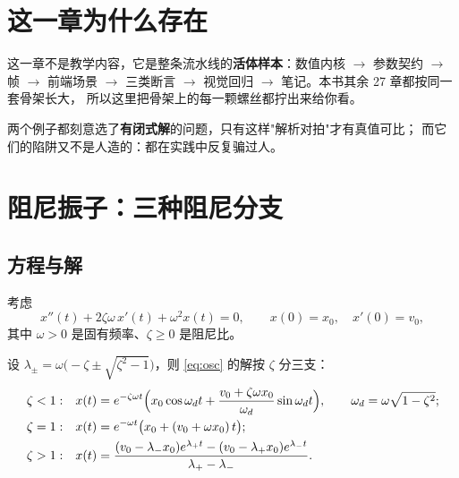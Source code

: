 

\section{这一章为什么存在}

这一章不是教学内容，它是整条流水线的\textbf{活体样本}：数值内核 $\to$ 参数契约 $\to$ 帧
$\to$ 前端场景 $\to$ 三类断言 $\to$ 视觉回归 $\to$ 笔记。本书其余 27 章都按同一套骨架长大，
所以这里把骨架上的每一颗螺丝都拧出来给你看。

两个例子都刻意选了\textbf{有闭式解}的问题，只有这样"解析对拍"才有真值可比；
而它们的陷阱又不是人造的：都在实践中反复骗过人。

\section{阻尼振子：三种阻尼分支}

\subsection{方程与解}

考虑
\begin{equation}
  x''(t) + 2\zeta\omega\,x'(t) + \omega^2 x(t) = 0,\qquad x(0)=x_0,\quad x'(0)=v_0,
  \label{eq:osc}
\end{equation}
其中 $\omega>0$ 是固有频率、$\zeta\ge 0$ 是阻尼比。

\begin{theorem}[三种阻尼分支]
\label{thm:branches}
设 $\lambda_\pm = \omega\bigl(-\zeta \pm \sqrt{\zeta^2-1}\bigr)$，则 \eqref{eq:osc} 的解按 $\zeta$ 分三支：
\begin{align}
  \zeta<1:\quad & x(t) = e^{-\zeta\omega t}\Bigl(x_0\cos\omega_d t
      + \frac{v_0+\zeta\omega x_0}{\omega_d}\sin\omega_d t\Bigr),
      \qquad \omega_d = \omega\sqrt{1-\zeta^2};\\
  \zeta=1:\quad & x(t) = e^{-\omega t}\bigl(x_0 + (v_0+\omega x_0)\,t\bigr);\\
  \zeta>1:\quad & x(t) = \frac{(v_0-\lambda_- x_0)e^{\lambda_+ t}
      - (v_0-\lambda_+ x_0)e^{\lambda_- t}}{\lambda_+-\lambda_-}.
\end{align}
\end{theorem}

